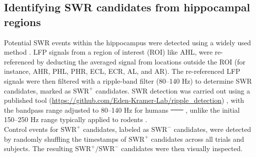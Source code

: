 \documentclass[preprint,review,12pt]{elsarticle}%
\providecommand{\DIFaddtex}[1]{{\protect\color{blue}\uwave{#1}}} %
\providecommand{\DIFdeltex}[1]{{\protect\color{red}\sout{#1}}}                      %
\providecommand{\DIFaddbegin}{} %
\providecommand{\DIFaddend}{} %
\providecommand{\DIFdelbegin}{} %
\providecommand{\DIFdelend}{} %
\providecommand{\DIFadd}[1]{\texorpdfstring{\DIFaddtex{#1}}{#1}} %
\providecommand{\DIFdel}[1]{\texorpdfstring{\DIFdeltex{#1}}{}} %
\newcommand{\DIFscaledelfig}{0.5}
\newlength{\DIFdelgraphicswidth} %
\newlength{\DIFdelgraphicsheight} %
\newcommand{\DIFaddincludegraphics}[2][]{{\color{blue}\fbox{\DIFOincludegraphics[#1]{#2}}}} %
\newcommand{\DIFdelincludegraphics}[2][]{%
\sbox{\DIFdelgraphicsbox}{\DIFOincludegraphics[#1]{#2}}%
\settoboxwidth{\DIFdelgraphicswidth}{\DIFdelgraphicsbox} %
\settoboxtotalheight{\DIFdelgraphicsheight}{\DIFdelgraphicsbox} %
\scalebox{\DIFscaledelfig}{%
\parbox[b]{\DIFdelgraphicswidth}{\usebox{\DIFdelgraphicsbox}\\[-\baselineskip] \rule{\DIFdelgraphicswidth}{0em}}\llap{\resizebox{\DIFdelgraphicswidth}{\DIFdelgraphicsheight}{%
\setlength{\unitlength}{\DIFdelgraphicswidth}%
\begin{picture}(1,1)%
\thicklines\linethickness{2pt} %
{\color[rgb]{1,0,0}\put(0,0){\framebox(1,1){}}}%
{\color[rgb]{1,0,0}\put(0,0){\line( 1,1){1}}}%
{\color[rgb]{1,0,0}\put(0,1){\line(1,-1){1}}}%
\end{picture}%
}\hspace*{3pt}}} %
} %
\DeclareRobustCommand{\DIFaddbegin}{\DIFOaddbegin \let\includegraphics\DIFaddincludegraphics} %
\DeclareRobustCommand{\DIFaddend}{\DIFOaddend \let\includegraphics\DIFOincludegraphics} %
\DeclareRobustCommand{\DIFdelbegin}{\DIFOdelbegin \let\includegraphics\DIFdelincludegraphics} %
\DeclareRobustCommand{\DIFdelend}{\DIFOaddend \let\includegraphics\DIFOincludegraphics} %
\begin{document}
\subsection{Identifying SWR candidates from hippocampal regions}
Potential SWR events within the hippocampus were detected using a widely used method \cite{liu_consensus_2022}. LFP signals from a region of interest (ROI) like AHL, were re-referenced by deducting the averaged signal from locations outside the ROI (for instance, AHR, PHL, PHR, ECL, ECR, AL, and AR). The re-referenced LFP signals were then filtered with a ripple-band filter (80--140 Hz) to determine SWR candidates, marked as $\textrm{SWR}^+$ candidates. SWR detection was carried out using a published tool (\url{https://github.com/Eden-Kramer-Lab/ripple_detection}) \cite{kay_hippocampal_2016}, with the bandpass range adjusted to 80--140 Hz for humans \DIFdelbegin \DIFdel{\mbox{%
\cite{norman_hippocampal_2019} }\hspace{0pt}%
\mbox{%
\cite{norman_hippocampal_2021}}\hspace{0pt}%
}\DIFdelend \DIFaddbegin \DIFadd{\mbox{%
\cite{norman_hippocampal_2019, norman_hippocampal_2021, liu_consensus_2022}}\hspace{0pt}%
}\DIFaddend , unlike the initial 150--250 Hz range typically applied to rodents \DIFaddbegin \DIFadd{\mbox{%
\cite{buzsaki_hippocampal_2015}}\hspace{0pt}%
}\DIFaddend .
\\
\indent
Control events for $\textrm{SWR}^+$ candidates, labeled as $\textrm{SWR}^-$ candidates, were detected by randomly shuffling the timestamps of $\textrm{SWR}^+$ candidates across all trials and subjects. The resulting $\textrm{SWR}^+/\textrm{SWR}^-$ candidates were then visually inspected.
\end{document}

